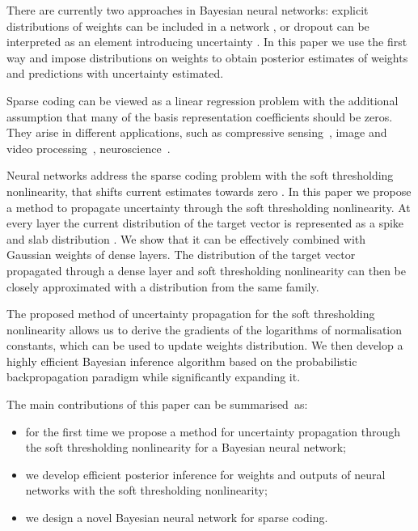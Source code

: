 \documentclass[letterpaper]{article}
\begin{document}
There are currently two approaches in Bayesian neural networks: explicit distributions of weights can be included in a network \citep{hernandez2015probabilistic, ranganath2015deep}, or dropout can be interpreted as an element introducing uncertainty \citep{gal2016dropout}. In this paper we use the first way and impose distributions on weights to obtain posterior estimates of weights and predictions with uncertainty estimated.

Sparse coding can be viewed as a linear regression problem with the additional assumption that many of the basis representation coefficients should be zeros. They arise in different applications, such as compressive sensing~\citep{candes2008introduction}, image and video processing~\citep{mairal2014sparse}, neuroscience~\citep{baillet1997bayesian, jas2017learning}.

Neural networks address the sparse coding problem with the soft thresholding nonlinearity, that shifts current estimates towards zero \citep{gregor2010learning}. In this paper we propose a method to propagate uncertainty through the soft thresholding nonlinearity. At every layer the current distribution of the target vector is represented as a spike and slab distribution \citep{mitchell1988bayesian}. We show that it can be effectively combined with Gaussian weights of dense layers. The distribution of the target vector propagated through a dense layer and soft thresholding nonlinearity can then be closely approximated with a distribution from the same family.

The proposed method of uncertainty propagation for the soft thresholding nonlinearity allows us to derive the gradients of the logarithms of normalisation constants, which can be used to update weights distribution. We then develop a highly efficient Bayesian inference algorithm based on the probabilistic backpropagation paradigm while significantly expanding it.

The main contributions of this paper can be summarised~as:
\begin{itemize}
\item for the first time we propose a method for uncertainty propagation through the soft thresholding nonlinearity for a Bayesian neural network;
\item we develop efficient posterior inference for weights and outputs of neural networks with the soft thresholding nonlinearity;
\item we design a novel Bayesian neural network for sparse coding.
\end{itemize}
\end{document}
